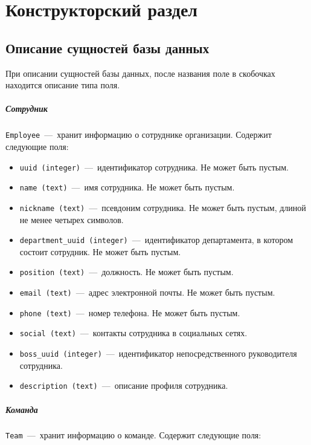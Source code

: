 \chapter{Конструкторский раздел}

\section{Описание сущностей базы данных}
При описании сущностей базы данных, после названия поле в скобочках находится описание типа поля.

\paragraph{Сотрудник} \mbox{}

\texttt{Employee}~---~хранит информацию о сотруднике организации. Содержит следующие поля:

\begin{itemize}
	\item \texttt{uuid (integer)}~---~идентификатор сотрудника. Не может быть пустым.
	\item \texttt{name (text)}~---~имя сотрудника. Не может быть пустым.
	\item \texttt{nickname (text)}~---~псевдоним сотрудника. Не может быть пустым, длиной не менее четырех символов.
	\item \texttt{department\_uuid (integer)}~---~идентификатор департамента, в котором состоит сотрудник. Не может быть пустым.
	\item \texttt{position (text)}~---~должность. Не может быть пустым.
	\item \texttt{email (text)}~---~адрес электронной почты. Не может быть пустым.
	\item \texttt{phone (text)}~---~номер телефона. Не может быть пустым.
	\item \texttt{social (text)}~---~контакты сотрудника в социальных сетях. 
	\item \texttt{boss\_uuid (integer)}~---~идентификатор непосредственного руководителя сотрудника.
	\item \texttt{description (text)}~---~описание профиля сотрудника.
\end{itemize}

\paragraph{Команда} \mbox{}

\texttt{Team}~---~хранит информацию о команде. Содержит следующие поля:

